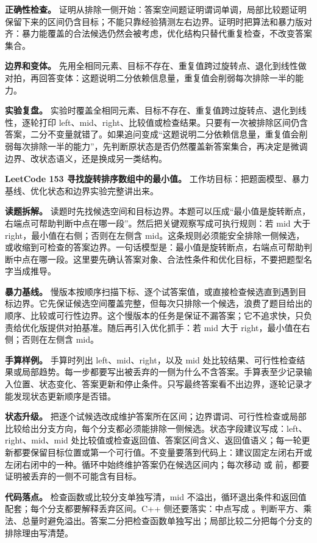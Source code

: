 \textbf{正确性检查。} 证明从排除一侧开始：答案空间题证明谓词单调，局部比较题证明保留下来的区间仍含目标；不能只靠经验猜测左右边界。证明时把算法和暴力版对齐：暴力能覆盖的合法候选仍然会被考虑，优化结构只替代重复检查，不改变答案集合。

\textbf{边界和变体。} 先用全相同元素、目标不存在、重复值跨过旋转点、退化到线性做对拍，再回答变体：这题说明二分依赖信息量，重复值会削弱每次排除一半的能力。

\textbf{实验复盘。} 实验时覆盖全相同元素、目标不存在、重复值跨过旋转点、退化到线性，逐轮打印 left、mid、right、比较值或检查结果。只要有一次被排除区间仍含答案，二分不变量就错了。如果追问变成“这题说明二分依赖信息量，重复值会削弱每次排除一半的能力”，先判断原状态是否仍然覆盖新答案集合，再决定是微调边界、改状态语义，还是换成另一类结构。

\noindent\textbf{LeetCode 153 寻找旋转排序数组中的最小值。} 工作坊目标：把题面模型、暴力基线、优化状态和边界实验完整讲出来。

\textbf{读题拆解。} 读题时先找候选空间和目标边界。本题可以压成“最小值是旋转断点，右端点可帮助判断中点在哪一段”。然后把关键观察写成可执行规则：若 mid 大于 right，最小值在右侧；否则在左侧含 mid。这条规则必须能安全排除一侧候选，或收缩到可检查的答案边界。一句话模型是：最小值是旋转断点，右端点可帮助判断中点在哪一段。这里要先确认答案对象、合法性条件和优化目标，不要把题型名字当成推导。

\textbf{暴力基线。} 慢版本按顺序扫描下标、逐个试答案值，或直接检查候选直到遇到目标边界。它先保证候选空间覆盖完整，但每次只排除一个候选，浪费了题目给出的顺序、比较或可行性边界。这个慢版本的任务是保证不漏答案；它不追求快，只负责给优化版提供对拍基准。随后再引入优化抓手：若 mid 大于 right，最小值在右侧；否则在左侧含 mid。

\textbf{手算样例。} 手算时列出 left、mid、right，以及 mid 处比较结果、可行性检查结果或局部趋势。每一步都要写出被丢弃的一侧为什么不含答案。手算表至少记录输入位置、状态变化、答案更新和停止条件。只写最终答案看不出边界，逐轮记录才能发现状态更新顺序是否错。

\textbf{状态升级。} 把逐个试候选改成维护答案所在区间；边界谓词、可行性检查或局部比较给出分支方向，每个分支都必须能排除一侧候选。状态字段建议写成：left、right、mid、mid 处比较值或检查返回值、答案区间含义、返回值语义；每一轮更新都要保留目标位置或第一个可行值。不变量要落到代码上：建议固定左闭右开或左闭右闭中的一种。循环中始终维护答案仍在候选区间内；每次移动  或  前，都要证明被丢弃的一侧不可能含有目标。

\textbf{代码落点。} 检查函数或比较分支单独写清，mid 不溢出，循环退出条件和返回值配套；每个分支都要解释丢弃区间。C++ 侧还要落实：中点写成 。判断平方、乘法、总量时避免溢出。答案二分把检查函数单独写出；局部比较二分把每个分支的排除理由写清楚。

